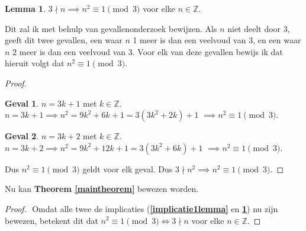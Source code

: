 \documentclass[12pt, dutch, a4paper]{article}
\theoremstyle{definition}
\newtheorem{lemma}{Lemma}[theorem]
\newtheorem{case}{Geval}
\begin{document}
\newpage
\begin{lemma} \label{implicatie2lemma}
    $3 \nmid n \implies n^2 \equiv 1 \pmod{3} $ voor elke $n \in \mathbb{Z}$. 
\end{lemma}

Dit zal ik met behulp van gevallenonderzoek bewijzen. 
Als $n$ niet deelt door 3, geeft dit twee gevallen, een waar $n$ 1 meer is dan 
een veelvoud van 3, en een waar $n$ 2 meer is dan een veelvoud van 3. Voor elk 
van deze gevallen bewijs ik dat hieruit volgt dat $n^2 \equiv 1 \pmod{3}$.

\begin{proof} 
    \begin{case} $n = 3k + 1$ met $k \in \mathbb{Z}$. \newline
        $n = 3k + 1 \implies n^2 = 9k^2 + 6k + 1 = 3(3k^2 + 2k) + 1$ \newline
        $\implies n^2 \equiv 1 \pmod{3}$.
    \end{case}
    \begin{case} $n = 3k + 2$ met $k \in \mathbb{Z}$. \newline
        $n = 3k + 2 \implies n^2 = 9k^2 + 12k + 1 = 3(3k^2 + 6k) + 1$ \newline
        $\implies n^2 \equiv 1 \pmod{3}$.
    \end{case}
    Dus $n^2 \equiv 1 \pmod{3}$ geldt voor elk geval. \newline
    Dus $3 \nmid n^2 \implies n^2 \equiv 1 \pmod{3}$.
\end{proof}

Nu kan \textbf{Theorem \ref{maintheorem}} bewezen worden.
\begin{proof} $ $ \newline
    Omdat alle twee de implicaties 
    (\textbf{\cref{implicatie1lemma}} en \textbf{\cref{implicatie2lemma}})
    nu zijn bewezen, betekent dit dat
    $n^2 \equiv 1 \pmod{3} \iff 3 \nmid n$ voor elke $n \in \mathbb{Z}$.
\end{proof}
\end{document}
